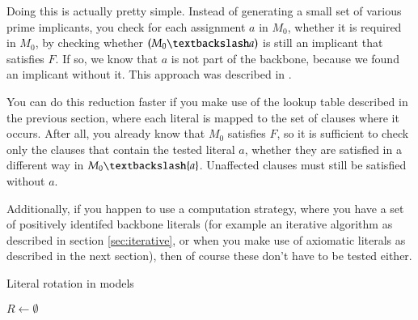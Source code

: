 Doing this is actually pretty simple. Instead of generating a small set of various prime implicants, you check for each assignment $a$ in $M_0$, whether it is required in $M_0$, by checking whether $(M_0 \textbackslash a)$ is still an implicant that satisfies $F$. If so, we know that $a$ is not part of the backbone, because we found an implicant without it. This approach was described in \cite{mjl15}.

You can do this reduction faster if you make use of the lookup table described in the previous section, where each literal is mapped to the set of clauses where it occurs. After all, you already know that $M_0$ satisfies $F$, so it is sufficient to check only the clauses that contain the tested literal $a$, whether they are satisfied in a different way in $M_0 \textbackslash \{a\}$. Unaffected clauses must still be satisfied without $a$.

Additionally, if you happen to use a computation strategy, where you have a set of positively identifed backbone literals (for example an iterative algorithm as described in section \ref{sec:iterative}, or when you make use of axiomatic literals as described in the next section), then of course these don't have to be tested either.



\begin{algorithm}
\caption{{\sc Literal rotation in models}}
\DontPrintSemicolon
{}
$R \gets \emptyset$\;
\;

\end{algorithm}

